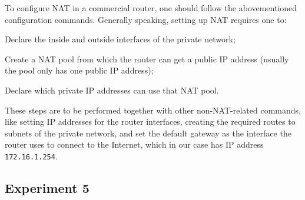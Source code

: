 \documentclass[a4paper, 11pt]{report}
\begin{document}
To configure NAT in a commercial router, one should follow the abovementioned configuration commands. Generally speaking, setting up NAT requires one to:
\begin{enumerate*}
    \item Declare the inside and outside interfaces of the private network;
    \item Create a NAT pool from which the router can get a public IP address (usually the pool only has one public IP address);
    \item Declare which private IP addresses can use that NAT pool.
\end{enumerate*}
These steps are to be performed together with other non-NAT-related commands, like setting IP addresses for the router interfaces, creating the required routes to subnets of the private network, and set the default gateway as the interface the router uses to connect to the Internet, which in our case has IP address \texttt{172.16.1.254}. 

\subsection{Experiment 5} \label{sec:Exp5}
\end{document}
